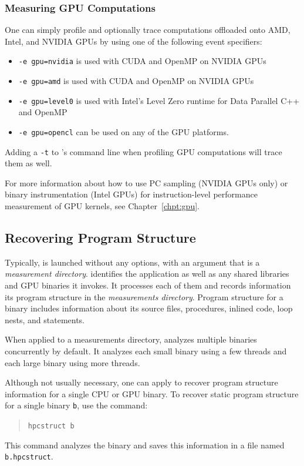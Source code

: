 \documentclass[11pt,twoside,letterpaper]{report}
\begin{document}
\subsubsection{Measuring GPU Computations}

One can simply profile and optionally trace computations offloaded onto AMD, Intel, and NVIDIA GPUs by using one of the following event specifiers:
\begin{itemize}
\item  {\tt -e gpu=nvidia}  is used with CUDA and OpenMP on NVIDIA GPUs
\item  {\tt -e gpu=amd}  is used with CUDA and OpenMP on NVIDIA GPUs
\item  {\tt -e gpu=level0}  is used with Intel's Level Zero runtime for Data Parallel C++ and OpenMP
\item  {\tt -e gpu=opencl}  can be used on any of the GPU platforms.
\end{itemize}

Adding a {\tt -t} to \hpcrun{}'s command line when profiling GPU computations will trace them as well.

For more information about how to use PC sampling (NVIDIA GPUs only) or binary instrumentation (Intel GPUs) for instruction-level performance measurement of GPU kernels, see Chapter~\ref{chpt:gpu}.


\subsection{Recovering Program Structure}

Typically, \hpcstruct{} is launched without any options, with an argument that is a \HPCToolkit{}  \emph{measurement directory}.
\hpcstruct{} identifies the application as well as any shared libraries and GPU binaries it invokes.
It processes each of them and records information its program structure in the \emph{measurements directory}.
Program structure for a binary includes information about its source files, procedures, inlined code, loop nests, and statements.

When applied to a measurements directory, \hpcstruct{} analyzes multiple binaries concurrently by default.
It analyzes each small binary using a few threads and each large binary using more threads.

Although not usually necessary, one can apply \hpcstruct{}  to recover program structure information for a single CPU or GPU binary.
To recover static program structure for a single binary \texttt{b}, use the command:
\begin{quote}
  \verb|hpcstruct b|
\end{quote}
This command analyzes the binary and saves this information in a file named \texttt{b.hpcstruct}.
\end{document}
